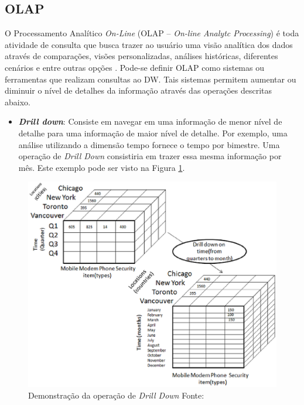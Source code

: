 \subsection{OLAP}

\label{sec-olap}

O Processamento Analítico \emph{On-Line} (OLAP – \emph{On-line Analytc Processing}) é toda atividade de consulta que busca trazer ao usuário uma visão analítica dos dados através de comparações, visões personalizadas, análises históricas, diferentes cenários e entre outras opções \cite{kimball2002}.
%
Pode-se definir OLAP como sistemas ou ferramentas que realizam consultas ao DW.
%
Tais sistemas permitem aumentar ou diminuir o nível de detalhes da informação através das operações descritas abaixo. 



\begin{itemize}

	\item \textbf{\emph{Drill down}}: Consiste em navegar em uma informação de menor nível de detalhe para uma informação de maior nível de detalhe. Por exemplo, uma análise utilizando a dimensão tempo fornece o tempo por bimestre. Uma operação de \emph{Drill Down} consistiria em trazer essa mesma informação por mês. Este exemplo pode ser visto na Figura \ref{fig-dw-rollup}.
\end{itemize}
	
\begin{figure}[!htb]
 	\centering
 		\includegraphics[scale=0.7]{figuras/dw-drill-down}
 		\caption{Demonstração da operação de \emph{Drill Down}   Fonte: \cite{TutorialsPoint}}
 		\label{fig-dw-rollup}
 \end{figure}

